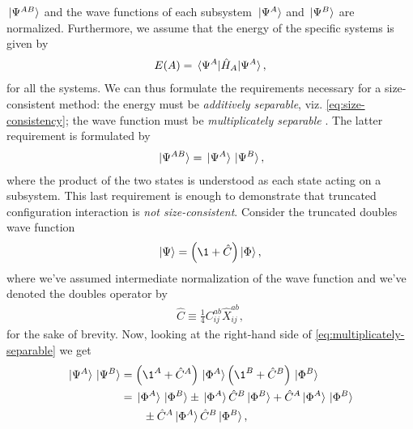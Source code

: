             $\ket*{\Psi^{AB}}$ and the wave functions of each subsystem
            $\ket*{\Psi^{A}}$ and $\ket*{\Psi^{B}}$ are normalized.
            Furthermore, we assume that the energy of the specific systems is
            given by
            \begin{align}
                E(A) = \mel*{\Psi^{A}}{\hat{H}_{A}}{\Psi^{A}},
            \end{align}
            for all the systems.
            We can thus formulate the requirements necessary for a
            size-consistent method: the energy must be \emph{additively
            separable}, viz. \autoref{eq:size-consistency}; the wave function
            must be \emph{multiplicately separable} \cite{helgaker-molecular}.
            The latter requirement is formulated by
            \begin{align}
                \ket*{\Psi^{AB}}
                = \ket*{\Psi^{A}}\ket*{\Psi^{B}},
                \label{eq:multiplicately-separable}
            \end{align}
            where the product of the two states is understood as each state
            acting on a subsystem.
            This last requirement is enough to demonstrate that truncated
            configuration interaction is \emph{not size-consistent}.
            Consider the truncated doubles wave function
            \begin{align}
                \ket{\Psi} = \para{\1 + \hat{C}}\ket{\slat},
            \end{align}
            where we've assumed intermediate normalization of the wave function
            and we've denoted the doubles operator by
            \begin{align}
                \hat{C} \equiv \frac{1}{4}C^{ab}_{ij}\hat{X}^{ab}_{ij},
            \end{align}
            for the sake of brevity.
            Now, looking at the right-hand side of
            \autoref{eq:multiplicately-separable} we get
            \begin{align}
                \ket*{\Psi^{A}}\ket*{\Psi^{B}}
                &= \para{\1^{A} + \hat{C}^{A}}\ket*{\slat^A}
                \para{\1^{B} + \hat{C}^{B}}\ket*{\slat^B}
                \\
                &=
                \ket*{\slat^{A}}\ket*{\slat^{B}}
                \pm \ket*{\slat^{A}}\hat{C}^{B}\ket*{\slat^{B}}
                + \hat{C}^{A}\ket*{\slat^{A}}\ket*{\slat^{B}}
                \nonumber \\
                &\qquad
                \pm \hat{C}^{A}\ket*{\slat^{A}}\hat{C}^{B}\ket*{\slat^{B}},
            \end{align}
